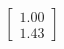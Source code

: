 \documentclass[preview]{standalone}
\begin{document}
\begin{align*}
\begin{bmatrix} 1.00 \\ 1.43 \end{bmatrix}
\end{align*}
\end{document}
